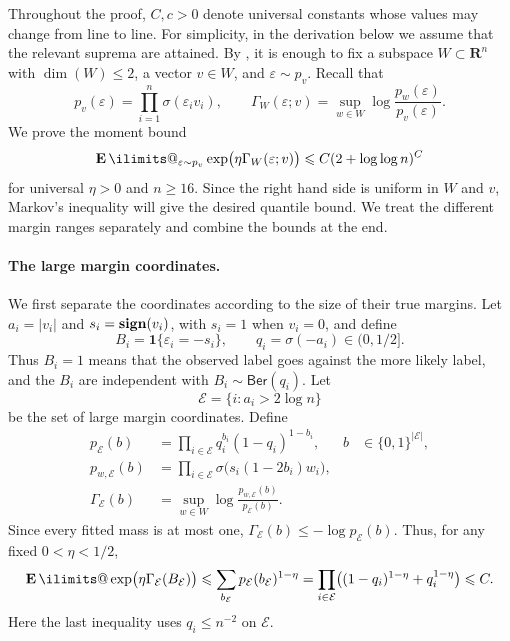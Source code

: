 \documentclass[11pt, letterpaper, hidelinks]{article}
\makeatletter
\renewcommand{\proofname}{\textit{\textbf{Proof}}}
\renewenvironment{proof}[1][\proofname]{\par\pushQED{\qed}\normalfont \topsep6\p@\@plus6\p@\relax\trivlist\item[\hskip\labelsep#1\@addpunct{}]\ignorespaces}{\popQED\endtrivlist\@endpefalse}
\newcommand{\proofsketchname}{\textit{\textbf{Proof sketch}}}
\newenvironment{proofsketch}
  {\begin{proof}[\proofsketchname]}
  {\end{proof}}
\newcommand{\R}{\mathbf R}
\DeclareMathOperator{\sign}{\bf sign}
\newcommand{\1}{\mathbf 1}
\newcommand{\eps}{\varepsilon}
\renewcommand{\leq}{\leqslant}
\renewcommand{\geq}{\geqslant}
\newcommand{\E}{\operatorname*{\mathbf{E}}\ilimits@}
\theoremstyle{plain}
\theoremstyle{definition}
\newcommand{\Ber}[1]{\mathsf{Ber}\left(#1\right)}
\makeatother
\begin{document}
\begin{proofsketch}
Throughout the proof, $C,c>0$ denote universal constants whose values may
change from line to line.
For simplicity, in the derivation below we assume that the relevant
suprema are attained.
By , it is enough to fix a subspace
$W\subset\R^n$ with $\dim(W)\leq2$, a vector $v\in W$, and
$\eps\sim p_v$.  Recall that
\[
p_v(\eps)=\prod_{i=1}^n\sigma(\eps_i v_i),
\qquad
\Gamma_W(\eps;v)=\sup_{w\in W}\log\frac{p_w(\eps)}{p_v(\eps)}.
\]
We prove the moment bound
\begin{equation}
\label{eq:d2-sketch-mgf}
\E_{\eps\sim p_v}\exp\bigl(\eta\Gamma_W(\eps;v)\bigr)
\leq C(2+\log\log n)^C
\end{equation}
for universal $\eta>0$ and $n\geq16$.  Since the right hand side is uniform
in $W$ and $v$, Markov's inequality will give the desired quantile bound.
We treat the different margin ranges separately and combine the bounds at the
end.

\paragraph{The large margin coordinates.}
We first separate the coordinates according to the size of their true margins.
Let $a_i=|v_i|$ and $s_i=\sign(v_i)$, with $s_i=1$ when $v_i=0$, and define
\[
B_i=\1\{\eps_i=-s_i\},
\qquad q_i=\sigma(-a_i)\in(0,1/2].
\]
Thus $B_i=1$ means that the observed label goes against the more likely label,
and the $B_i$ are independent with $B_i\sim\Ber{q_i}$.  Let
\[
\mathcal E=\{i:a_i>2\log n\}
\]
be the set of large margin coordinates.  Define
\[
\begin{aligned}
p_{\mathcal E}(b)&=\prod_{i\in\mathcal E}q_i^{b_i}(1-q_i)^{1-b_i},
&b&\in\{0,1\}^{|\mathcal E|},\\
p_{w,\mathcal E}(b)&=\prod_{i\in\mathcal E}
\sigma\bigl(s_i(1-2b_i)w_i\bigr),\\
\Gamma_{\mathcal E}(b)&=\sup_{w\in W}
\log\frac{p_{w,\mathcal E}(b)}{p_{\mathcal E}(b)}.&&
\end{aligned}
\]
Since every fitted mass is at most one,
$\Gamma_{\mathcal E}(b)\leq-\log p_{\mathcal E}(b)$.  Thus, for any fixed
$0<\eta<1/2$,
\begin{equation}
\label{eq:d2-sketch-large-margin-moment}
\E\exp\bigl(\eta\Gamma_{\mathcal E}(B_{\mathcal E})\bigr)
\leq\sum_{b_{\mathcal E}}p_{\mathcal E}(b_{\mathcal E})^{1-\eta}
=\prod_{i\in\mathcal E}\bigl((1-q_i)^{1-\eta}+q_i^{1-\eta}\bigr)\leq C.
\end{equation}
Here the last inequality uses $q_i\leq n^{-2}$ on $\mathcal E$.


\end{proofsketch}
\end{document}
